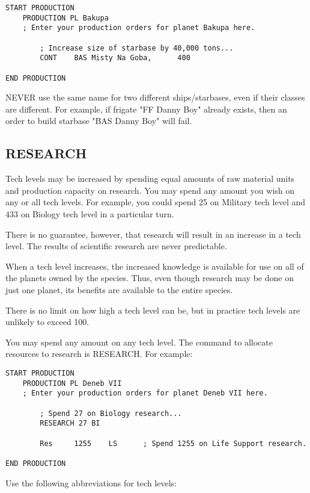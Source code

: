 \documentclass[10pt,titlepage]{article}
\begin{document}
\begin{verbatim}
START PRODUCTION
    PRODUCTION PL Bakupa
    ; Enter your production orders for planet Bakupa here.

        ; Increase size of starbase by 40,000 tons...
        CONT    BAS Misty Na Goba,      400

END PRODUCTION
\end{verbatim} 

NEVER use the same name for two different ships/starbases, even if their
classes are different.  For example, if frigate "FF Danny Boy" already
exists, then an order to build starbase "BAS Danny Boy" will fail.


\subsection{RESEARCH}
\label{sec:research}


Tech levels may be increased by spending equal amounts of raw material units
and production capacity on research.  You may spend any amount you wish on any
or all tech levels.  For example, you could spend 25 on Military tech level and
433 on Biology tech level in a particular turn.

There is no guarantee, however, that research will result in an increase in
a tech level.  The results of scientific research are never predictable.

When a tech level increases, the increased knowledge is available for use on
all of the planets owned by the species.  Thus, even though research may be
done on just one planet, its benefits are available to the entire species.

There is no limit on how high a tech level can be, but in practice tech levels
are unlikely to exceed 100.

You may spend any amount on any tech level.  The command to allocate resources
to research is RESEARCH.  For example:

\begin{verbatim}
START PRODUCTION
    PRODUCTION PL Deneb VII
    ; Enter your production orders for planet Deneb VII here.

        ; Spend 27 on Biology research...
        RESEARCH 27 BI

        Res     1255    LS      ; Spend 1255 on Life Support research.

END PRODUCTION
\end{verbatim} 

\noindent Use the following abbreviations for tech levels:
\end{document}
